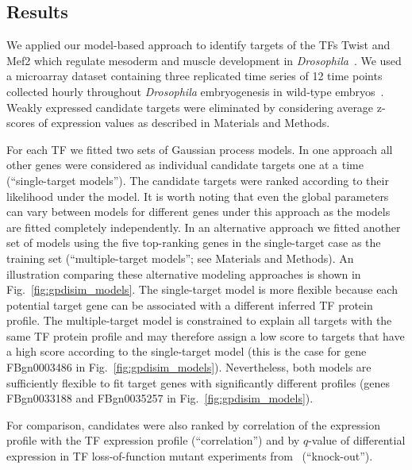\documentclass{pnastwo}
\begin{document}
\begin{article}
\section{Results}

We applied our model-based approach to identify targets of the TFs
Twist and Mef2 which regulate mesoderm and muscle development in
\emph{Drosophila}~\cite{Sandmann2007,Zinzen2009}. We used a microarray dataset
containing three replicated time series of 12 time points collected
hourly throughout \emph{Drosophila} embryogenesis in wild-type
embryos~\cite{Tomancak2002}.  Weakly expressed candidate targets were eliminated by 
considering average z-scores of expression values as described in
Materials and Methods.

For each TF we fitted two sets of Gaussian process models. In one
approach all other genes were considered as individual candidate targets one at a
time (``single-target models'').  The candidate targets were ranked
according to their likelihood under the model.  It is worth noting that even the global
parameters can vary between models for different genes under this approach as the models
are fitted completely independently. In an alternative approach we fitted another set of models using the five
top-ranking genes in the single-target case as the training set (``multiple-target models''; see
Materials and Methods).  An illustration comparing these alternative
modeling approaches is shown in Fig.~\ref{fig:gpdisim_models}. The
single-target model is more flexible because each
potential target gene can be associated with a different inferred TF
protein profile. The multiple-target model is constrained to explain
all targets with the same TF protein profile and may therefore assign
a low score to targets that have a high score according to the
single-target model (this is the case for gene FBgn0003486 in
Fig.~\ref{fig:gpdisim_models}). Nevertheless, both models are
sufficiently flexible to fit target genes with significantly different
profiles (genes FBgn0033188 and FBgn0035257 in
Fig.~\ref{fig:gpdisim_models}).

For comparison, candidates were also ranked by correlation of the
expression profile with the TF expression profile (``correlation'')
and by $q$-value of differential expression in TF loss-of-function mutant
experiments from~\cite{Sandmann2006a,Sandmann2007} (``knock-out''). 


\end{article}
\end{document}

